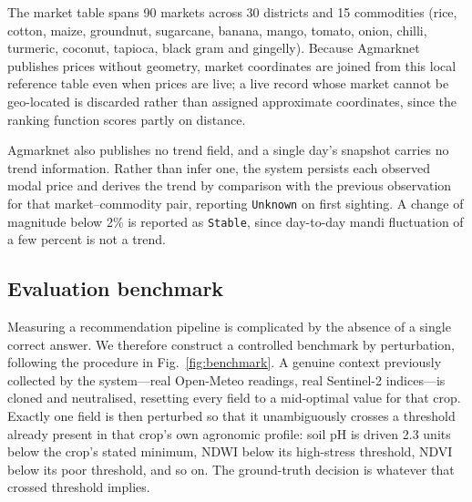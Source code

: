 \documentclass[preprint,12pt]{elsarticle}
\begin{document}
\begin{table}[H]
\centering
\caption{Schema of the local fallback tables. Both cover 30 districts of
Tamil Nadu, India.}
\label{tab:schema}
\footnotesize
{}
\end{table}

The market table spans 90 markets across 30 districts and 15 commodities
(rice, cotton, maize, groundnut, sugarcane, banana, mango, tomato, onion,
chilli, turmeric, coconut, tapioca, black gram and gingelly). Because
Agmarknet publishes prices without geometry, market coordinates are joined
from this local reference table even when prices are live; a live record
whose market cannot be geo-located is discarded rather than assigned
approximate coordinates, since the ranking function scores partly on
distance.

Agmarknet also publishes no trend field, and a single day's snapshot
carries no trend information. Rather than infer one, the system persists
each observed modal price and derives the trend by comparison with the
previous observation for that market--commodity pair, reporting
\texttt{Unknown} on first sighting. A change of magnitude below 2\% is
reported as \texttt{Stable}, since day-to-day mandi fluctuation of a few
percent is not a trend.

\subsection{Evaluation benchmark}

Measuring a recommendation pipeline is complicated by the absence of a
single correct answer. We therefore construct a controlled benchmark by
perturbation, following the procedure in
Fig.~\ref{fig:benchmark}. A genuine context previously collected by the
system---real Open-Meteo readings, real Sentinel-2 indices---is cloned and
neutralised, resetting every field to a mid-optimal value for that crop.
Exactly one field is then perturbed so that it unambiguously crosses a
threshold already present in that crop's own agronomic profile: soil pH is
driven 2.3 units below the crop's stated minimum, NDWI below its
high-stress threshold, NDVI below its poor threshold, and so on. The
ground-truth decision is whatever that crossed threshold implies.
\end{document}
